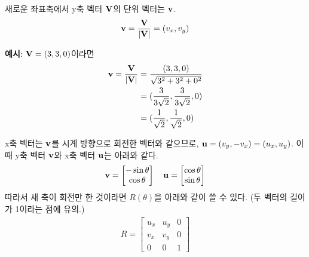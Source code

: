 새로운 좌표축에서 y축 벡터 $\bold{V}$의 단위 벡터는 $\bold{v}$.
$$
\bold{v} = {\bold{V} \over |\bold{V}|} = (v_x, v_y)
$$
\begin{framed}
  \noindent \textbf{예시}: $\bold{V} = (3, 3, 0)$이라면
  $$
  \begin{aligned}
    \bold{v} = {\bold{V} \over |\bold{V}|} &= {(3, 3, 0) \over \sqrt{3^2 + 3^2 + 0^2}} \\
    &= ({3 \over 3\sqrt{2}}, {3 \over 3\sqrt{2}}, 0) \\
    &= ({1 \over \sqrt{2}}, {1 \over \sqrt{2}}, 0)
  \end{aligned}
  $$
\end{framed}
x축 벡터는 $\bold{v}$를 시계 방향으로 회전한 벡터와 같으므로, $\bold{u} = (v_y, -v_x) = (u_x, u_y)$. 이때 y축 벡터 $\bold{v}$와 x축 벡터 $\bold{u}$는 아래와 같다.
$$
\bold{v} =
\begin{bmatrix}
  -\sin{\theta} \\
  \cos{\theta}
\end{bmatrix}
\quad
\bold{u} =
\begin{bmatrix}
  \cos{\theta} \\
  \sin{\theta}
\end{bmatrix}
$$
따라서 새 축이 회전만 한 것이라면 $R(\theta)$을 아래와 같이 쓸 수 있다. (두 벡터의 길이가 1이라는 점에 유의.)
$$
\begin{aligned}
  R =
  \begin{bmatrix}
    u_x & u_y & 0 \\
    v_x & v_y & 0 \\
    0 & 0 & 1
  \end{bmatrix}
\end{aligned}
$$

